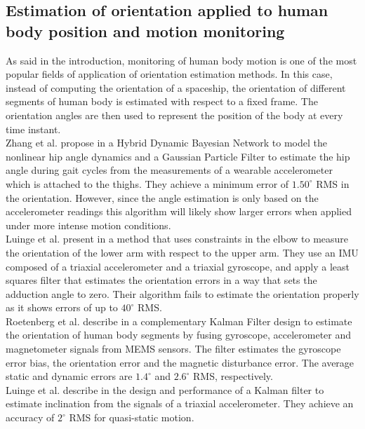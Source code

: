 \documentclass{IOS-Book-Article}
\begin{document}
\subsection{Estimation of orientation applied to human body position and motion monitoring}
\label{subsec:orientation_human_body_soa}
\indent \indent As said in the introduction, monitoring of human body motion is one of the most popular fields of application of orientation estimation methods. In this case, instead of computing the orientation of a spaceship, the orientation of different segments of human body is estimated with respect to a fixed frame. The orientation angles are then used to represent the position of the body at every time instant. \\
\indent Zhang et al. propose in \cite{zhang_ambulatory_2009} a Hybrid Dynamic Bayesian Network to model the nonlinear hip angle dynamics and a Gaussian Particle Filter to estimate the hip angle during gait cycles from the measurements of a wearable accelerometer which is attached to the thighs. They achieve a minimum error of $1.50^{\circ}$ RMS in the orientation. However, since the angle estimation is only based on the accelerometer readings this algorithm will likely show larger errors when applied under more intense motion conditions. \\
\indent Luinge et al. present in \cite{luinge_ambulatory_2007} a method that uses constraints in the elbow to measure the orientation of the lower arm with respect to the upper arm. They use an IMU composed of a triaxial accelerometer and a triaxial gyroscope, and apply a least squares filter that estimates the orientation errors in a way that sets the adduction angle to zero. Their algorithm fails to estimate the orientation properly as it shows errors of up to $40^{\circ}$ RMS.\\
\indent Roetenberg et al. describe in \cite{roetenberg_compensation_2005} a complementary Kalman Filter design to estimate the orientation of human body segments by fusing gyroscope, accelerometer and magnetometer signals from MEMS sensors. The filter estimates the gyroscope error bias, the orientation error and the magnetic disturbance error. The average static and dynamic errors are $1.4^{\circ}$ and $2.6^{\circ}$ RMS, respectively.\\
\indent Luinge et al. describe in \cite{luinge_inclination_2004} the design and performance of a Kalman filter to estimate inclination from the signals of a triaxial accelerometer. They achieve an accuracy of $2^{\circ}$ RMS for quasi-static motion. \\
\end{document}
